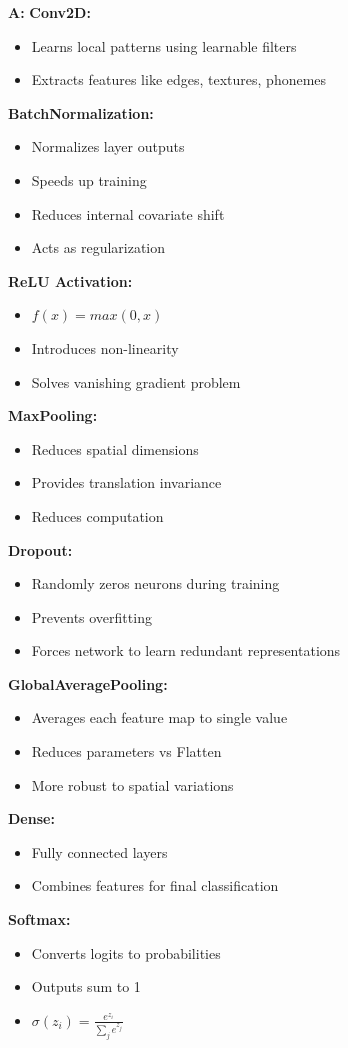 \documentclass[a4paper,12pt]{article}
\newcommand{\vivaA}[1]{\textcolor{answercolor}{\textbf{A:}} #1}
\begin{document}
\vivaA{
\textbf{Conv2D:}
\begin{itemize}
    \item Learns local patterns using learnable filters
    \item Extracts features like edges, textures, phonemes
\end{itemize}

\textbf{BatchNormalization:}
\begin{itemize}
    \item Normalizes layer outputs
    \item Speeds up training
    \item Reduces internal covariate shift
    \item Acts as regularization
\end{itemize}

\textbf{ReLU Activation:}
\begin{itemize}
    \item $f(x) = max(0, x)$
    \item Introduces non-linearity
    \item Solves vanishing gradient problem
\end{itemize}

\textbf{MaxPooling:}
\begin{itemize}
    \item Reduces spatial dimensions
    \item Provides translation invariance
    \item Reduces computation
\end{itemize}

\textbf{Dropout:}
\begin{itemize}
    \item Randomly zeros neurons during training
    \item Prevents overfitting
    \item Forces network to learn redundant representations
\end{itemize}

\textbf{GlobalAveragePooling:}
\begin{itemize}
    \item Averages each feature map to single value
    \item Reduces parameters vs Flatten
    \item More robust to spatial variations
\end{itemize}

\textbf{Dense:}
\begin{itemize}
    \item Fully connected layers
    \item Combines features for final classification
\end{itemize}

\textbf{Softmax:}
\begin{itemize}
    \item Converts logits to probabilities
    \item Outputs sum to 1
    \item $\sigma(z_i) = \frac{e^{z_i}}{\sum_j e^{z_j}}$
\end{itemize}}
\end{document}
